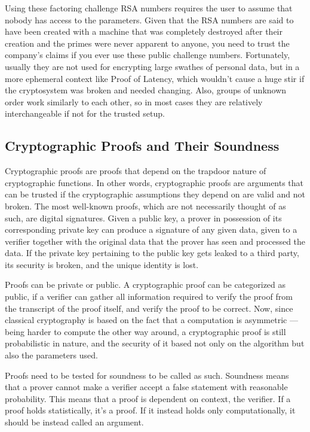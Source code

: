 Using these factoring challenge RSA numbers requires the user to assume that nobody has access to the parameters. Given that the RSA numbers are said to have been created with a machine that was completely destroyed after their creation and the primes were never apparent to anyone, you need to trust the company's claims if you ever use these public challenge numbers. Fortunately, usually they are not used for encrypting large swathes of personal data, but in a more ephemeral context like Proof of Latency, which wouldn't cause a huge stir if the cryptosystem was broken and needed changing. Also, groups of unknown order work similarly to each other, so in most cases they are relatively interchangeable if not for the trusted setup.


\subsection{Cryptographic Proofs and Their Soundness}
Cryptographic proofs are proofs that depend on the trapdoor nature of cryptographic functions. In other words, cryptographic proofs are arguments that can be trusted if the cryptographic assumptions they depend on are valid and not broken. The most well-known proofs, which are not necessarily thought of as such, are digital signatures. Given a public key, a prover in possession of its corresponding private key can produce a signature of any given data, given to a verifier together with the original data that the prover has seen and processed the data. If the private key pertaining to the public key gets leaked to a third party, its security is broken, and the unique identity is lost.

Proofs can be private or public. A cryptographic proof can be categorized as public, if a verifier can gather all information required to verify the proof from the transcript of the proof itself, and verify the proof to be correct. Now, since classical cryptography is based on the fact that a computation is asymmetric --- being harder to compute the other way around, a cryptographic proof is still probabilistic in nature, and the security of it based not only on the algorithm but also the parameters used.

Proofs need to be tested for soundness to be called as such. Soundness means that a prover cannot make a verifier accept a false statement with reasonable probability. This means that a proof is dependent on context, the verifier. If a proof holds statistically, it's a proof. If it instead holds only computationally, it should be instead called an argument.

